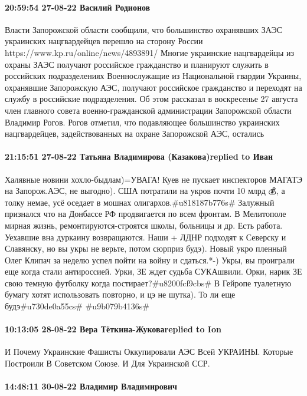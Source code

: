 \paragraph{20:59:54 27-08-22 Василий Родионов}

Власти Запорожской области сообщили, что большинство охранявших ЗАЭС украинских нацгвардейцев перешло на сторону России
https://www.kp.ru/online/news/4893891/
Многие украинские нацгвардейцы из охраны ЗАЭС получают российское гражданство и планируют служить в российских подразделениях
Военнослужащие из Национальной гвардии Украины, охранявшие Запорожскую АЭС, получают российское гражданство и переходят на службу в российские подразделения. Об этом рассказал в воскресенье 27 августа член главного совета военно-гражданской администрации Запорожской области Владимир Рогов.
Рогов отметил, что подавляющее большинство украинских нацгвардейцев, задействованных на охране Запорожской АЭС, остались

\paragraph{21:15:51 27-08-22 Татьяна Владимирова (Казакова)replied to Иван}

Халявные новини хохло-быдлам)=УВАГА! Куев не пускает инспекторов МАГАТЭ на
Запорож.АЭС, не выгодно). США потратили на укров почти 10 млрд 💰, а толку
немае, усё оседает в мошнах олигархов.#u818187b776s# Залужный признался что на
Донбассе РФ продвигается по всем фронтам. В Мелитополе мирная жизнь,
ремонтируются-строятся школы, больницы и др. Есть работа. Уехавшие вна дуркаину
возвращаются. Наши + ЛДНР подходят к Северску и Славянску, но вы укры не
верьте, потом сюрприз будэ). Новый укро пленный Олег Клипач за неделю успел
пойти на войну и сдаться.*-) Укры, вы проиграли еще когда стали антироссией.
Урки, ЗЕ ждет судьба СУКАшвили. Орки, нарик ЗЕ свою темную футболку когда
постирает?#u8200fcf9cbs# В Гейропе туалетную бумагу хотят использовать
повторно, и цэ не шутка). То ли еще будэ#u730de0a55cs# #u9b079b4136s#

\paragraph{10:13:05 28-08-22 Вера Тёткина-Жуковаreplied to Ion}

И Почему Украинские Фашисты Оккупировали АЭС Всей УКРАИНЫ. Которые Построили В
Советском Союзе.
И Для Украинской ССР.

\paragraph{14:48:11 30-08-22 Владимир Владимирович}

